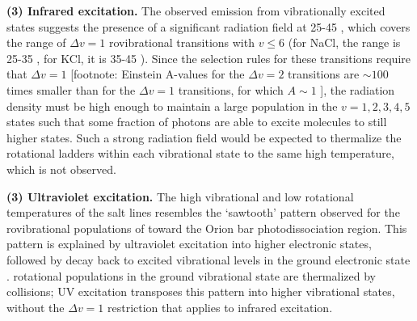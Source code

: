 \documentclass[twocolumn]{aastex62}
\begin{document}
\par{\textbf{(3) Infrared excitation.}} 
The observed emission from vibrationally excited states suggests the
presence of a significant radiation field at 25-45 \um, which covers the range
of $\Delta v=1$ rovibrational transitions with $v\leq6$ (for NaCl, the range is
25-35 \um, for KCl, it is 35-45 \um).  Since the selection rules for these
transitions require that $\Delta v=1$ [footnote: Einstein A-values for the 
$\Delta v=2$ transitions are $\sim100$ times smaller than for the $\Delta v=1$
transitions, for which $A\sim1$ \pers], the radiation density must be high
enough to maintain a large population in the $v=1,
2, 3, 4, 5$ states such that some fraction of photons are able to excite
molecules to still higher states.  Such a strong radiation field would
be expected to thermalize the rotational ladders within each vibrational
state to the same high temperature, which is not observed.



\par{\textbf{(3) Ultraviolet excitation.}}
%
%
The high vibrational and low rotational temperatures of the
salt lines resembles the `sawtooth' pattern observed for the rovibrational
populations of \hh toward the Orion bar photodissociation region.  This
pattern is explained by ultraviolet excitation into higher electronic states,
followed by decay back to excited vibrational levels in the ground electronic
state \citep{Kaplan2017}.  \hh rotational populations in the ground vibrational
state are thermalized by collisions; UV excitation transposes this pattern into
higher vibrational states, without the $\Delta v=1$ restriction that applies to
infrared excitation.
\end{document}
